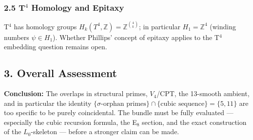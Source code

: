 \subsubsection*{2.5 T$^4$ Homology and Epitaxy}

T$^4$ has homology groups $H_k(T^4, \mathbb{Z}) = \mathbb{Z}^{\binom{4}{k}}$;
in particular $H_1 = \mathbb{Z}^4$ (winding numbers $\psi \in H_1$).
Whether Phillips' concept of epitaxy applies to the T$^4$ embedding question
remains open.

\subsection*{3. Overall Assessment}

\begin{center}
\end{center}

\begin{mdframed}[style=info]
\textbf{Conclusion:} The overlaps in structural primes, $V_4$/CPT, the 13-smooth
ambient, and in particular the identity
$\{\sigma\text{-orphan primes}\} \cap \{\text{cubic sequence}\} = \{5, 11\}$
are too specific to be purely coincidental. The bundle must be fully evaluated —
especially the cubic recursion formula, the E$_8$ section, and the exact
construction of the $L_0$-skeleton — before a stronger claim can be made.
\end{mdframed}

